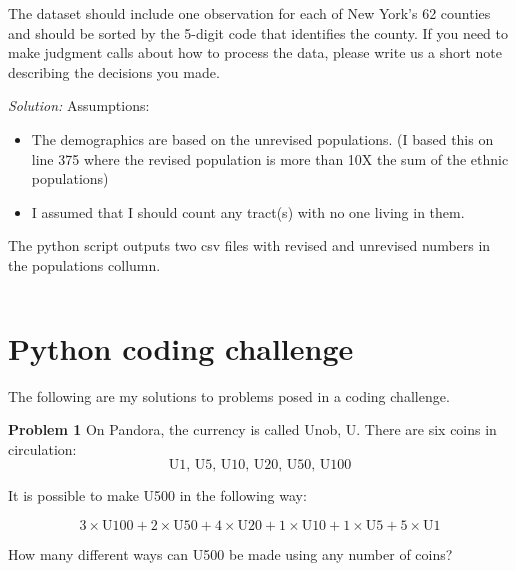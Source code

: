 \documentclass{article}
\newcommand{\mintedpython}[1]{\inputminted[frame=lines,framesep=2mm,baselinestretch=1.2,bgcolor=LightGray,fontsize=\footnotesize,linenos]{python}{#1}}
\begin{document}
\bigskip
The dataset should include one observation for each of New York's 62 counties and should be
sorted by the 5-digit code that identifies the county. If you need to make judgment calls about how
to process the data, please write us a short note describing the decisions you made.

\bigskip

{\it Solution: }Assumptions:
\begin{itemize}
\item The demographics are based on the unrevised populations.  (I based this on line 375 where the revised population is more than 10X the sum of the ethnic populations)
\item I assumed that I should count any tract(s) with no one living in them.
\end{itemize}

\bigskip
The python script outputs two csv files with revised and unrevised numbers in the populations collumn.  

\mintedpython{Pandas_coding_challenge/task1.py}







\section{Python coding challenge}
\label{sec:py_chal}

The following are my solutions to problems posed in a coding challenge.

{\bf Problem 1} On Pandora, the currency is called Unob, U. There are six coins in circulation:
\[\text{U1, U5, U10, U20, U50, U100}\]

It is possible to make U500 in the following way:

\[3\times\text{U}100 + 2\times\text{U}50 + 4\times\text{U}20 + 1\times\text{U}10 + 1\times\text{U}5 + 5\times\text{U}1\]

How many different ways can U500 be made using any number of coins?
\end{document}
